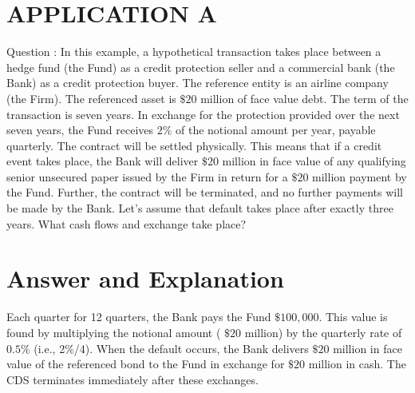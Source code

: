 \documentclass[11pt]{article}
\begin{document}
\section*{APPLICATION A}
Question : In this example, a hypothetical transaction takes place between a hedge fund (the Fund) as a credit protection seller and a commercial bank (the Bank) as a credit protection buyer. The reference entity is an airline company (the Firm). The referenced asset is $\$ 20$ million of face value debt. The term of the transaction is seven years. In exchange for the protection provided over the next seven years, the Fund receives $2 \%$ of the notional amount per year, payable quarterly. The contract will be settled physically. This means that if a credit event takes place, the Bank will deliver $\$ 20$ million in face value of any qualifying senior unsecured paper issued by the Firm in return for a $\$ 20$ million payment by the Fund. Further, the contract will be terminated, and no further payments will be made by the Bank. Let's assume that default takes place after exactly three years. What cash flows and exchange take place?

\section*{Answer and Explanation}
Each quarter for 12 quarters, the Bank pays the Fund $\$ 100,000$. This value is found by multiplying the notional amount ( $\$ 20$ million) by the quarterly rate of $0.5 \%$ (i.e., 2\%/4). When the default occurs, the Bank delivers $\$ 20$ million in face value of the referenced bond to the Fund in exchange for $\$ 20$ million in cash. The CDS terminates immediately after these exchanges.
\end{document}
